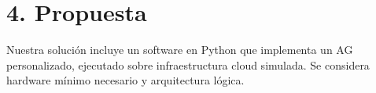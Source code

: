 \section*{4. Propuesta}
Nuestra solución incluye un software en Python que implementa un AG personalizado, ejecutado sobre infraestructura cloud simulada. Se considera hardware mínimo necesario y arquitectura lógica.
